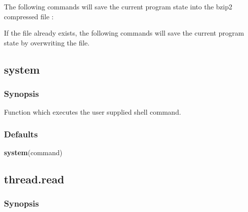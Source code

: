 

 The following commands will save the current program state into the bzip2 compressed file : 
  





 If the file  already exists, the following commands will save the current program state by overwriting the file. 
  



  

 \newpage 

 \subsection{system} 

  
 \subsubsection{Synopsis} 

 Function which executes the user supplied shell command. 
  

  
 \subsubsection{Defaults} 

 \textsf{\textbf{system}(command)} 

  

 \newpage 

 \subsection{thread.read} 

  
 \subsubsection{Synopsis} 

